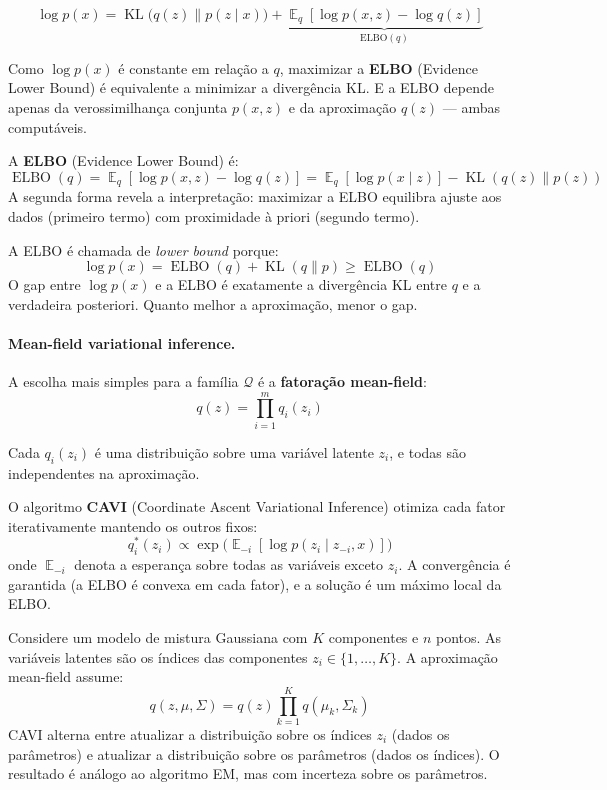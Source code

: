 \documentclass{tufte-handout}
\DeclareMathOperator{\E}{\mathbb{E}}
\DeclareMathOperator{\KL}{KL}
\DeclareMathOperator{\ELBO}{ELBO}
\begin{document}
\[
\log p(x) = \KL\big(q(z) \parallel p(z \mid x)\big) + \underbrace{\E_q[\log p(x, z) - \log q(z)]}_{\text{ELBO}(q)}
\]

Como $\log p(x)$ é constante em relação a $q$, maximizar a \textbf{ELBO} (Evidence
Lower Bound) é equivalente a minimizar a divergência KL. E a ELBO depende apenas da
verossimilhança conjunta $p(x, z)$ e da aproximação $q(z)$ --- ambas computáveis.

\begin{defn}[ELBO]
    A \textbf{ELBO} (Evidence Lower Bound) é:
    \[
    \ELBO(q) = \E_q[\log p(x, z) - \log q(z)] = \E_q[\log p(x \mid z)] - \KL(q(z) \parallel p(z))
    \]
    A segunda forma revela a interpretação: maximizar a ELBO equilibra ajuste aos
    dados (primeiro termo) com proximidade à priori (segundo termo).
\end{defn}

\begin{remark}
    A ELBO é chamada de \textit{lower bound} porque:
    \[
    \log p(x) = \ELBO(q) + \KL(q \parallel p) \geq \ELBO(q)
    \]
    O gap entre $\log p(x)$ e a ELBO é exatamente a divergência KL entre $q$ e a
    verdadeira posteriori. Quanto melhor a aproximação, menor o gap.
\end{remark}

\paragraph{Mean-field variational inference.}

A escolha mais simples para a família $\mathcal{Q}$ é a \textbf{fatoração
mean-field}:
\[
q(z) = \prod_{i=1}^m q_i(z_i)
\]

Cada $q_i(z_i)$ é uma distribuição sobre uma variável latente $z_i$, e todas são
independentes na aproximação.

\begin{defn}[CAVI]
    O algoritmo \textbf{CAVI} (Coordinate Ascent Variational Inference) otimiza cada
    fator iterativamente mantendo os outros fixos:
    \[
    q_i^*(z_i) \propto \exp\!\big(\E_{-i}[\log p(z_i \mid z_{-i}, x)]\big)
    \]
    onde $\E_{-i}$ denota a esperança sobre todas as variáveis exceto $z_i$.
    A convergência é garantida (a ELBO é convexa em cada fator), e a solução é um
    máximo local da ELBO.
\end{defn}

\begin{exmp}
    Considere um modelo de mistura Gaussiana com $K$ componentes e $n$ pontos.
    As variáveis latentes são os índices das componentes $z_i \in \{1, \dots, K\}$.
    A aproximação mean-field assume:
    \[
    q(z, \mu, \Sigma) = q(z) \prod_{k=1}^K q(\mu_k, \Sigma_k)
    \]
    CAVI alterna entre atualizar a distribuição sobre os índices $z_i$ (dados os
    parâmetros) e atualizar a distribuição sobre os parâmetros (dados os índices).
    O resultado é análogo ao algoritmo EM, mas com incerteza sobre os parâmetros.
\end{exmp}
\end{document}
